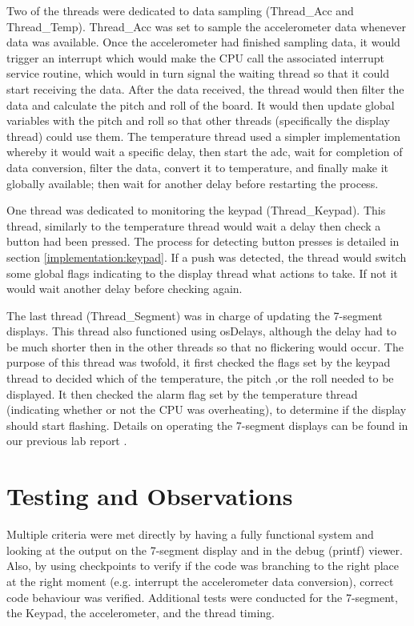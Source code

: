 \documentclass[12pt]{article}
\begin{document}
Two of the threads were dedicated to data sampling (Thread\_Acc and Thread\_Temp). Thread\_Acc was set to sample the accelerometer data whenever data was available. Once the accelerometer had finished sampling data, it would trigger an interrupt which would make the CPU call the associated interrupt service routine, which would in turn signal the waiting thread so that it could start receiving the data. After the data received, the thread would then filter the data and calculate the pitch and roll of the board. It would then update global variables with the pitch and roll so that other threads (specifically the display thread) could use them. The temperature thread used a simpler implementation whereby it would wait a specific delay, then start the adc, wait for completion of data conversion, filter the data, convert it to temperature, and finally make it globally available; then wait for another delay before restarting the process.

One thread was dedicated to monitoring the keypad (Thread\_Keypad). This thread, similarly to the temperature thread would wait a delay then check a button had been pressed. The process for detecting button presses is detailed in section \ref{implementation:keypad}. If a push was detected, the thread would switch some global flags indicating to the display thread what actions to take. If not it would wait another delay before checking again.

The last thread (Thread\_Segment) was in charge of updating the 7-segment displays. This thread also functioned using osDelays, although the delay had to be much shorter then in the other threads so that no flickering would occur. The purpose of this thread was twofold, it first checked the flags set by the keypad thread to decided which of the temperature, the pitch ,or the roll needed to be displayed. It then checked the alarm flag set by the temperature thread (indicating whether or not the CPU was overheating), to determine if the display should start flashing. Details on operating the 7-segment displays can be found in our previous lab report \cite{Lab2report}.

\section{Testing and Observations}
Multiple criteria were met directly by having a fully functional system and looking at the output on the 7-segment display and in the debug (printf) viewer. Also, by using checkpoints to verify if the code was branching to the right place at the right moment (e.g. interrupt the accelerometer data conversion), correct code behaviour was verified. Additional tests were conducted for the 7-segment, the Keypad, the accelerometer, and the thread timing.
\end{document}
